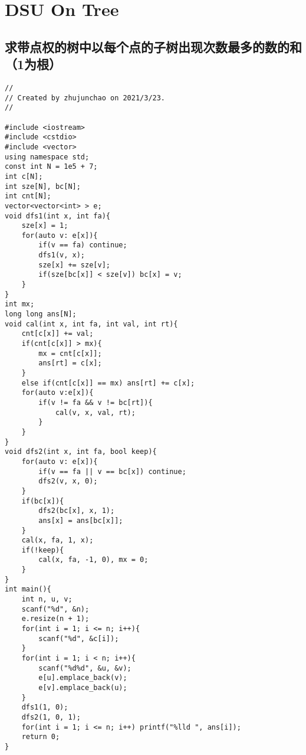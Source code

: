\section{DSU On Tree}
\subsection{求带点权的树中以每个点的子树出现次数最多的数的和（1为根）}
\begin{lstlisting}
//
// Created by zhujunchao on 2021/3/23.
//

#include <iostream>
#include <cstdio>
#include <vector>
using namespace std;
const int N = 1e5 + 7;
int c[N];
int sze[N], bc[N];
int cnt[N];
vector<vector<int> > e;
void dfs1(int x, int fa){
    sze[x] = 1;
    for(auto v: e[x]){
        if(v == fa) continue;
        dfs1(v, x);
        sze[x] += sze[v];
        if(sze[bc[x]] < sze[v]) bc[x] = v;
    }
}
int mx;
long long ans[N];
void cal(int x, int fa, int val, int rt){
    cnt[c[x]] += val;
    if(cnt[c[x]] > mx){
        mx = cnt[c[x]];
        ans[rt] = c[x];
    }
    else if(cnt[c[x]] == mx) ans[rt] += c[x];
    for(auto v:e[x]){
        if(v != fa && v != bc[rt]){
            cal(v, x, val, rt);
        }
    }
}
void dfs2(int x, int fa, bool keep){
    for(auto v: e[x]){
        if(v == fa || v == bc[x]) continue;
        dfs2(v, x, 0);
    }
    if(bc[x]){
        dfs2(bc[x], x, 1);
        ans[x] = ans[bc[x]];
    }
    cal(x, fa, 1, x);
    if(!keep){
        cal(x, fa, -1, 0), mx = 0;
    }
}
int main(){
    int n, u, v;
    scanf("%d", &n);
    e.resize(n + 1);
    for(int i = 1; i <= n; i++){
        scanf("%d", &c[i]);
    }
    for(int i = 1; i < n; i++){
        scanf("%d%d", &u, &v);
        e[u].emplace_back(v);
        e[v].emplace_back(u);
    }
    dfs1(1, 0);
    dfs2(1, 0, 1);
    for(int i = 1; i <= n; i++) printf("%lld ", ans[i]);
    return 0;
}
\end{lstlisting}

